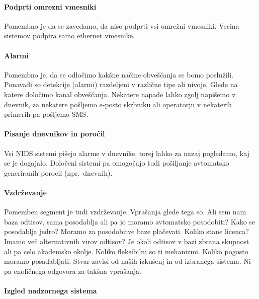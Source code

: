 \documentclass[12pt]{article}
\begin{document}

\paragraph{Podprti omrezni vmesniki} %

Pomembno je da se zavedamo, da niso podprti vsi omrežni vmesniki. Vecina sistemov podpira samo ethernet vmesnike.


\paragraph{Alarmi} %

Pomembno je, da se odločimo kakšne načine obveščanja se bomo poslužili. Ponavadi so detekcije (alarmi) razdeljeni v različne tipe ali nivoje.
Glede na katere določimo kanal obveščanja. 
Nekatere napade lahko zgolj napišemo v dnevnik, za nekatere pošljemo e-posto skrbniku ali operatorju v nekaterih primerih pa pošljemo SMS.


\paragraph{Pisanje dnevnikov in poročil} %

Vsi NIDS sistemi pišejo alarme v dnevnike, torej lahko za nazaj pogledamo, kaj se je dogajalo. Določeni sistemi pa omogočajo tudi pošiljanje avtomatsko generiranih porocil (npr.\ dnevnih).

\paragraph{Vzdrževanje} %

Pomemben segment je tudi vzdrževanje. Vprašanja glede tega so. Ali sem nam baza odtisov, sama posodablja ali pa jo moramo avtomatsko posodobiti? Kako se posodablja jedro? Moramo za posodobitve baze plačevati. Koliko stane licenca?
Imamo več alternativnih virov odtisov? Je okoli odtisov v bazi zbrana skupnost ali pa celo akademsko okolje.
Koliko fleksibilni so ti mehanizmi. Koliko pogosto moramo posadabljati. 
Stvar zavisi od naših izkušenj in od izbranega sistema. Ni pa enoličnega odgovora za takšna vprašanja.


\paragraph{Izgled nadzornega sistema} %
\end{document}
